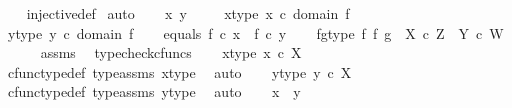 \begin{isabellebody}
%
\isadelimproof
\ \ %
\endisadelimproof
%
\isatagproof
{}\isamarkupfalse%
\ injective{\isacharunderscore}{\kern0pt}def\isanewline
{}\isamarkupfalse%
\ {\isacharparenleft}{\kern0pt}auto{\isacharparenright}{\kern0pt}\isanewline
\ \ \isamarkupfalse%
\ x\ y\ \isanewline
\ \ \isamarkupfalse%
\ x{\isacharunderscore}{\kern0pt}type{\isacharcolon}{\kern0pt}\ {\isachardoublequoteopen}x\ {\isasymin}\isactrlsub c\ domain\ f{\isachardoublequoteclose}\isanewline
\ \ \isamarkupfalse%
\ y{\isacharunderscore}{\kern0pt}type{\isacharcolon}{\kern0pt}\ {\isachardoublequoteopen}y\ {\isasymin}\isactrlsub c\ domain\ f{\isachardoublequoteclose}\isanewline
\ \ \isamarkupfalse%
\ equals{\isacharcolon}{\kern0pt}\ {\isachardoublequoteopen}f\ {\isasymcirc}\isactrlsub c\ x\ {\isacharequal}{\kern0pt}\ f\ {\isasymcirc}\isactrlsub c\ y{\isachardoublequoteclose}\isanewline
\ \ \isamarkupfalse%
\ fg{\isacharunderscore}{\kern0pt}type{\isacharcolon}{\kern0pt}\ {\isachardoublequoteopen}f\ {\isasymtimes}\isactrlsub f\ g\ {\isacharcolon}{\kern0pt}\ X\ {\isasymtimes}\isactrlsub c\ Z\ {\isasymrightarrow}\ Y\ {\isasymtimes}\isactrlsub c\ W{\isachardoublequoteclose}\isanewline
\ \ \ \ \isamarkupfalse%
\ assms\ \isamarkupfalse%
\ typecheck{\isacharunderscore}{\kern0pt}cfuncs\isanewline
\ \ \isamarkupfalse%
\ x{\isacharunderscore}{\kern0pt}type{}{\isacharcolon}{\kern0pt}\ {\isachardoublequoteopen}x\ {\isasymin}\isactrlsub c\ X{\isachardoublequoteclose}\isanewline
\ \ \ \ \isamarkupfalse%
\ cfunc{\isacharunderscore}{\kern0pt}type{\isacharunderscore}{\kern0pt}def\ type{\isacharunderscore}{\kern0pt}assms{\isacharparenleft}{\kern0pt}{}{\isacharparenright}{\kern0pt}\ x{\isacharunderscore}{\kern0pt}type\ \isamarkupfalse%
\ auto\isanewline
\ \ \isamarkupfalse%
\ y{\isacharunderscore}{\kern0pt}type{}{\isacharcolon}{\kern0pt}\ {\isachardoublequoteopen}y\ {\isasymin}\isactrlsub c\ X{\isachardoublequoteclose}\isanewline
\ \ \ \ \isamarkupfalse%
\ cfunc{\isacharunderscore}{\kern0pt}type{\isacharunderscore}{\kern0pt}def\ type{\isacharunderscore}{\kern0pt}assms{\isacharparenleft}{\kern0pt}{}{\isacharparenright}{\kern0pt}\ y{\isacharunderscore}{\kern0pt}type\ \isamarkupfalse%
\ auto\isanewline
\ \ \isamarkupfalse%
\ {\isachardoublequoteopen}x\ {\isacharequal}{\kern0pt}\ y{\isachardoublequoteclose}\isanewline

\end{isabellebody}
